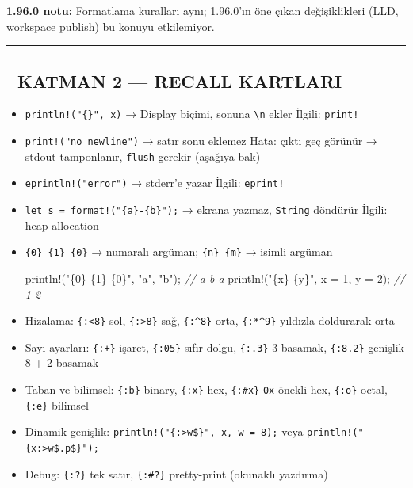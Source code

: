 \documentclass[12pt,a4paper]{article}
\newenvironment{Shaded}{}{}
\newcommand{\CommentTok}[1]{\textcolor[rgb]{0.38,0.63,0.69}{\textit{#1}}}
\newcommand{\DecValTok}[1]{\textcolor[rgb]{0.25,0.63,0.44}{#1}}
\newcommand{\NormalTok}[1]{#1}
\newcommand{\OperatorTok}[1]{\textcolor[rgb]{0.40,0.40,0.40}{#1}}
\newcommand{\StringTok}[1]{\textcolor[rgb]{0.25,0.44,0.63}{#1}}
\begin{document}
\textbf{1.96.0 notu:} Formatlama kuralları aynı; 1.96.0'ın öne çıkan değişiklikleri (LLD, workspace publish) bu konuyu etkilemiyor.

\begin{center}\rule{0.5\linewidth}{0.5pt}\end{center}

\subsection{🔵 KATMAN 2 --- RECALL KARTLARI}\label{katman-2-—-recall-kartlari-1}

\begin{itemize}
\item
  \texttt{println!("\{\}",\ x)} → Display biçimi, sonuna \texttt{\textbackslash{}n} ekler
  İlgili: \texttt{print!}
\item
  \texttt{print!("no\ newline")} → satır sonu eklemez
  Hata: çıktı geç görünür → stdout tamponlanır, \texttt{flush} gerekir (aşağıya bak)
\item
  \texttt{eprintln!("error")} → stderr'e yazar
  İlgili: \texttt{eprint!}
\item
  \texttt{let\ s\ =\ format!("\{a\}-\{b\}");} → ekrana yazmaz, \texttt{String} döndürür
  İlgili: heap allocation
\item
  \texttt{\{0\}\ \{1\}\ \{0\}} → numaralı argüman; \texttt{\{n\}\ \{m\}} → isimli argüman

\begin{Shaded}
\begin{Highlighting}[]
\NormalTok{println}\OperatorTok{!(}\StringTok{"\{0\} \{1\} \{0\}"}\OperatorTok{,} \StringTok{"a"}\OperatorTok{,} \StringTok{"b"}\OperatorTok{);}        \CommentTok{// a b a}
\NormalTok{println}\OperatorTok{!(}\StringTok{"\{x\} \{y\}"}\OperatorTok{,}\NormalTok{ x }\OperatorTok{=} \DecValTok{1}\OperatorTok{,}\NormalTok{ y }\OperatorTok{=} \DecValTok{2}\OperatorTok{);}        \CommentTok{// 1 2}
\end{Highlighting}
\end{Shaded}
\item
  Hizalama: \texttt{\{:\textless{}8\}} sol, \texttt{\{:\textgreater{}8\}} sağ, \texttt{\{:\^{}8\}} orta, \texttt{\{:*\^{}9\}} yıldızla doldurarak orta
\item
  Sayı ayarları: \texttt{\{:+\}} işaret, \texttt{\{:05\}} sıfır dolgu, \texttt{\{:.3\}} 3 basamak, \texttt{\{:8.2\}} genişlik 8 + 2 basamak
\item
  Taban ve bilimsel: \texttt{\{:b\}} binary, \texttt{\{:x\}} hex, \texttt{\{:\#x\}} \texttt{0x} önekli hex, \texttt{\{:o\}} octal, \texttt{\{:e\}} bilimsel
\item
  Dinamik genişlik: \texttt{println!("\{:\textgreater{}w\$\}",\ x,\ w\ =\ 8);} veya \texttt{println!("\{x:\textgreater{}w\$.p\$\}");}
\item
  Debug: \texttt{\{:?\}} tek satır, \texttt{\{:\#?\}} pretty-print (okunaklı yazdırma)


\end{itemize}
\end{document}
